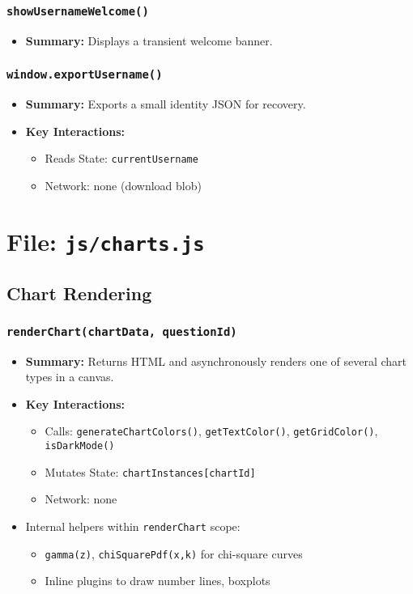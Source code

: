 \documentclass[11pt,letterpaper]{article}
\begin{document}
\subsubsection{\texttt{showUsernameWelcome()}}
\begin{itemize}
    \item \textbf{Summary:} Displays a transient welcome banner.
\end{itemize}

\subsubsection{\texttt{window.exportUsername()}}
\begin{itemize}
    \item \textbf{Summary:} Exports a small identity JSON for recovery.
    \item \textbf{Key Interactions:}
    \begin{itemize}
        \item Reads State: \texttt{currentUsername}
        \item Network: none (download blob)
    \end{itemize}
\end{itemize}

\section{File: \texttt{js/charts.js}}

\subsection{Chart Rendering}

\subsubsection{\texttt{renderChart(chartData, questionId)}}
\begin{itemize}
    \item \textbf{Summary:} Returns HTML and asynchronously renders one of several chart types in a canvas.
    \item \textbf{Key Interactions:}
    \begin{itemize}
        \item Calls: \texttt{generateChartColors()}, \texttt{getTextColor()}, \texttt{getGridColor()}, \texttt{isDarkMode()}
        \item Mutates State: \texttt{chartInstances[chartId]}
        \item Network: none
    \end{itemize}
    \item Internal helpers within \texttt{renderChart} scope:
    \begin{itemize}
        \item \texttt{gamma(z)}, \texttt{chiSquarePdf(x,k)} for chi-square curves
        \item Inline plugins to draw number lines, boxplots
    \end{itemize}
\end{itemize}
\end{document}
